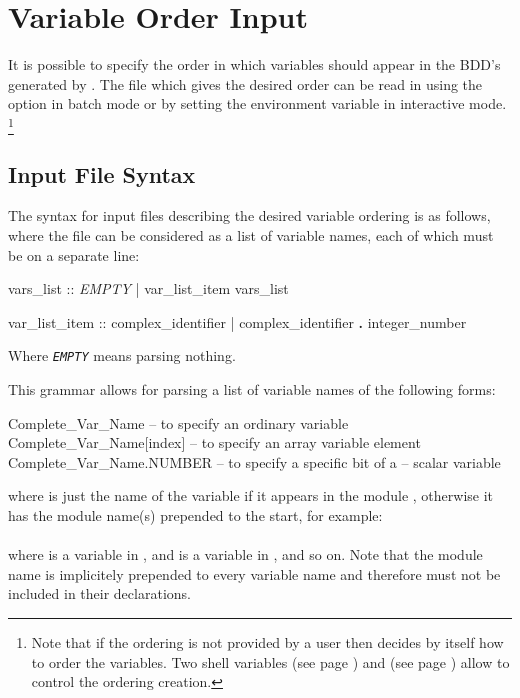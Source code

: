 \section{Variable Order Input}
\label{Variable::Order::Input}
%
It is possible to specify the order in which variables should appear
in the BDD's generated by \nusmv. 
%
The file which gives the desired order can be read in using the
 option in batch mode or by setting the
 environment variable in interactive mode.
%
 \footnote{Note that if the ordering is not provided by a user then
 \nusmv decides by itself how to order the variables. Two shell
 variables  (see page
 \pageref{bdd_static_order_heuristics}) and
  (see page \pageref{vars_order_type}) allow
 to control the ordering creation.}

\subsection{Input File Syntax}
\label{Input File Syntax}
%
The syntax for input files describing the desired variable ordering is
as follows, where the file can be considered as a list of variable
names, each of which must be on a separate line:
%
\begin{Grammar}
vars_list :: \textit{EMPTY}
         | var_list_item vars_list

var_list_item :: complex_identifier
             | complex_identifier \textbf{.} integer_number
\end{Grammar}
%
Where \textit{\texttt{EMPTY}} means parsing nothing.

This grammar allows for parsing a list of variable names of the
following forms:
%
\begin{nusmvCode}
Complete_Var_Name        -- to specify an ordinary variable
Complete_Var_Name[index] -- to specify an array variable element
Complete_Var_Name.NUMBER -- to specify a specific bit of a
                         -- scalar variable
\end{nusmvCode}
%
where  is just the name of the variable if
it appears in the module , otherwise it has the module
name(s) prepended to the start, for example:\\

\\

\noindent where  is a variable in , and
 is a variable in , and so
on. Note that the module name  is implicitely prepended
to every variable name and therefore must not be included in their
declarations.

